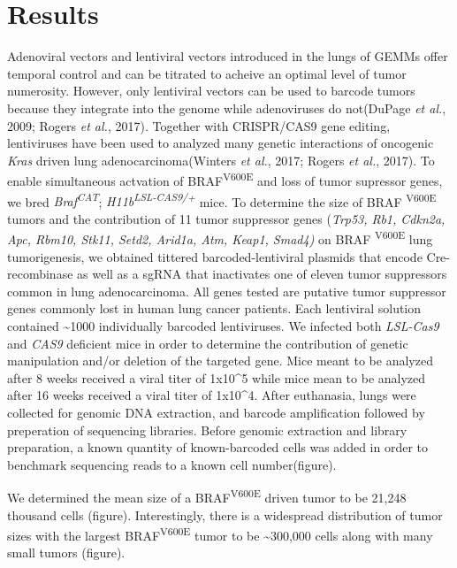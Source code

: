 \hypertarget{results}{%
\section{Results}\label{results}}

Adenoviral vectors and lentiviral vectors introduced in the lungs of GEMMs offer temporal control and can be titrated to acheive an optimal level of tumor numerosity. However, only lentiviral vectors can be used to barcode tumors because they integrate into the genome while adenoviruses do not(DuPage \emph{et al.}, 2009; Rogers \emph{et al.}, 2017). Together with CRISPR/CAS9 gene editing, lentiviruses have been used to analyzed many genetic interactions of oncogenic \emph{Kras} driven lung adenocarcinoma(Winters \emph{et al.}, 2017; Rogers \emph{et al.}, 2017). To enable simultaneous actvation of BRAF\textsuperscript{V600E} and loss of tumor supressor genes, we bred \emph{Braf\textsuperscript{CAT}}; \emph{H11b\textsuperscript{LSL-CAS9/+}} mice.
To determine the size of BRAF \textsuperscript{V600E} tumors and the contribution of 11 tumor suppressor genes (\emph{Trp53, Rb1, Cdkn2a, Apc, Rbm10, Stk11, Setd2, Arid1a, Atm, Keap1, Smad4)} on BRAF \textsuperscript{V600E} lung tumorigenesis, we obtained tittered barcoded-lentiviral plasmids that encode Cre-recombinase as well as a sgRNA that inactivates one of eleven tumor suppressors common in lung adenocarcinoma. All genes tested are putative tumor suppressor genes commonly lost in human lung cancer patients. Each lentiviral solution contained \textasciitilde1000 individually barcoded lentiviruses. We infected both \emph{LSL-Cas9} and \emph{CAS9} deficient mice in order to determine the contribution of genetic manipulation and/or deletion of the targeted gene. Mice meant to be analyzed after 8 weeks received a viral titer of 1x10\^{}5 while mice mean to be analyzed after 16 weeks received a viral titer of 1x10\^{}4. After euthanasia, lungs were collected for genomic DNA extraction, and barcode amplification followed by preperation of sequencing libraries. Before genomic extraction and library preparation, a known quantity of known-barcoded cells was added in order to benchmark sequencing reads to a known cell number(figure).

We determined the mean size of a BRAF\textsuperscript{V600E} driven tumor to be 21,248 thousand cells (figure). Interestingly, there is a widespread distribution of tumor sizes with the largest BRAF\textsuperscript{V600E} tumor to be \textasciitilde300,000 cells along with many small tumors (figure).

